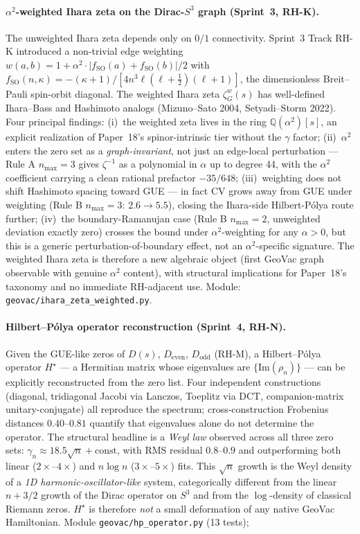 \documentclass[11pt]{article}
\begin{document}
\paragraph{$\alpha^2$-weighted Ihara zeta on the Dirac-$S^3$ graph
(Sprint~3, RH-K).}
The unweighted Ihara zeta depends only on $0/1$ connectivity. Sprint~3
Track RH-K introduced a non-trivial edge weighting
$w(a,b) = 1 + \alpha^2 \cdot |f_{\mathrm{SO}}(a) + f_{\mathrm{SO}}(b)|/2$
with $f_{\mathrm{SO}}(n,\kappa) = -(\kappa+1)/[4 n^3 \ell(\ell+\tfrac12)(\ell+1)]$,
the dimensionless Breit--Pauli spin-orbit diagonal. The weighted Ihara
zeta $\zeta_G^w(s)$ has well-defined Ihara--Bass and Hashimoto analogs
(Mizuno--Sato 2004, Setyadi--Storm 2022). Four principal findings:
(i)~the weighted zeta lives in the ring $\mathbb{Q}(\alpha^2)[s]$, an
explicit realization of Paper~18's spinor-intrinsic tier without the
$\gamma$ factor; (ii)~$\alpha^2$ enters the zero set as a
\emph{graph-invariant}, not just an edge-local perturbation --- Rule A
$n_{\max}=3$ gives $\zeta^{-1}$ as a polynomial in $\alpha$ up to
degree 44, with the $\alpha^2$ coefficient carrying a clean rational
prefactor $-35/648$; (iii)~weighting does not shift Hashimoto spacing
toward GUE --- in fact CV grows away from GUE under weighting (Rule
B $n_{\max}=3$: $2.6 \to 5.5$), closing the Ihara-side Hilbert-P\'olya
route further; (iv)~the boundary-Ramanujan case (Rule B $n_{\max}=2$,
unweighted deviation exactly zero) crosses the bound under
$\alpha^2$-weighting for any $\alpha > 0$, but this is a generic
perturbation-of-boundary effect, not an $\alpha^2$-specific signature.
The weighted Ihara zeta is therefore a new algebraic object
(first GeoVac graph observable with genuine $\alpha^2$ content), with
structural implications for Paper~18's taxonomy and no immediate
RH-adjacent use. Module:
\texttt{geovac/ihara\_zeta\_weighted.py}.

\paragraph{Hilbert--P\'olya operator reconstruction
(Sprint~4, RH-N).}  Given the GUE-like zeros of $D(s)$,
$D_{\mathrm{even}}$, $D_{\mathrm{odd}}$ (RH-M), a Hilbert--P\'olya
operator $H^\star$ --- a Hermitian matrix whose eigenvalues are
$\{\mathrm{Im}(\rho_n)\}$ --- can be explicitly reconstructed
from the zero list. Four independent constructions (diagonal,
tridiagonal Jacobi via Lanczos, Toeplitz via DCT,
companion-matrix unitary-conjugate) all reproduce the spectrum;
cross-construction Frobenius distances $0.40$--$0.81$ quantify
that eigenvalues alone do not determine the operator.  The
structural headline is a \emph{Weyl law} observed across all
three zero sets: $\gamma_n \approx 18.5 \sqrt{n} + \text{const}$,
with RMS residual $0.8$--$0.9$ and outperforming both linear
($2\times$--$4\times$) and $n\log n$ ($3\times$--$5\times$) fits.
This $\sqrt{n}$ growth is the Weyl density of a \emph{1D
harmonic-oscillator-like} system, categorically different from
the linear $n + 3/2$ growth of the Dirac operator on $S^3$ and
from the $\log$-density of classical Riemann zeros.  $H^\star$ is
therefore \emph{not} a small deformation of any native GeoVac
Hamiltonian.  Module \texttt{geovac/hp\_operator.py} (13 tests);
\end{document}
